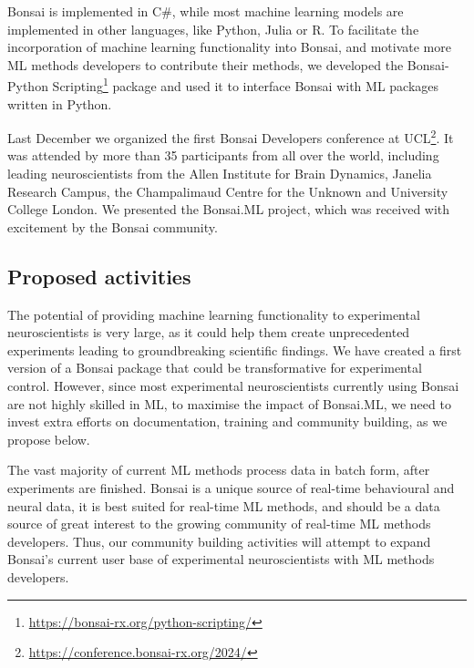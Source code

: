 Bonsai is implemented in C\#, while most machine learning models are
implemented in other languages, like Python, Julia or R.
%
To facilitate the incorporation of machine learning functionality into Bonsai,
and motivate more ML methods developers to contribute their methods, we
developed the Bonsai-Python
Scripting\footnote[6]{\url{https://bonsai-rx.org/python-scripting/}}
package and used it to interface Bonsai with ML packages written in Python.

Last December we organized the first Bonsai Developers conference at
UCL\footnote[7]{\url{https://conference.bonsai-rx.org/2024/}}. It was attended by more
than 35 participants from all over the world, including leading neuroscientists
from the Allen Institute for Brain Dynamics, Janelia Research Campus, the
Champalimaud Centre for the Unknown and University College London. We presented
the Bonsai.ML project, which was received with excitement by the Bonsai
community.

\subsection*{Proposed activities}

The potential of providing machine learning functionality to experimental
neuroscientists is very large, as it could help them create unprecedented
experiments leading to groundbreaking scientific findings.
%
We have created a first version of a Bonsai package that could be
transformative for experimental control.
%
However, since most experimental neuroscientists currently using Bonsai are not
highly skilled in ML, to maximise the impact of Bonsai.ML, we need to invest
extra efforts on documentation, training and community building, as we propose
below.

The vast majority of current ML methods process data in batch form, after
experiments are finished. Bonsai is a unique source of real-time behavioural and
neural data, it is best suited for real-time ML methods, and should be a data
source of great interest to the growing community of real-time ML methods
developers. Thus, our community building activities will attempt to expand
Bonsai's current user base of experimental neuroscientists with ML methods
developers.

